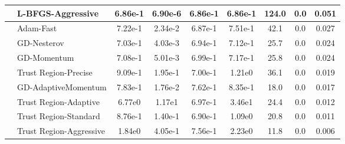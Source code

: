 \documentclass{article}
\begin{document}
\begin{longtable}{|l|l|c|c|c|c|c|c|c|}
\hline
 & L-BFGS-Aggressive & 6.86e-1 & 6.90e-6 & 6.86e-1 & 6.86e-1 & 124.0 & 0.0 & 0.051 \\
\hline
 & Adam-Fast & 7.22e-1 & 2.34e-2 & 6.87e-1 & 7.51e-1 & 42.1 & 0.0 & 0.027 \\
\hline
 & GD-Nesterov & 7.03e-1 & 4.03e-3 & 6.94e-1 & 7.12e-1 & 25.7 & 0.0 & 0.024 \\
\hline
 & GD-Momentum & 7.08e-1 & 5.01e-3 & 6.99e-1 & 7.17e-1 & 25.8 & 0.0 & 0.024 \\
\hline
 & Trust Region-Precise & 9.09e-1 & 1.95e-1 & 7.00e-1 & 1.21e0 & 36.1 & 0.0 & 0.019 \\
\hline
 & GD-AdaptiveMomentum & 7.83e-1 & 1.76e-2 & 7.62e-1 & 8.35e-1 & 18.0 & 0.0 & 0.017 \\
\hline
 & Trust Region-Adaptive & 6.77e0 & 1.17e1 & 6.97e-1 & 3.46e1 & 24.4 & 0.0 & 0.012 \\
\hline
 & Trust Region-Standard & 8.76e-1 & 1.40e-1 & 6.90e-1 & 1.09e0 & 20.8 & 0.0 & 0.011 \\
\hline
 & Trust Region-Aggressive & 1.84e0 & 4.05e-1 & 7.56e-1 & 2.23e0 & 11.8 & 0.0 & 0.006 \\
\end{longtable}
\end{document}
